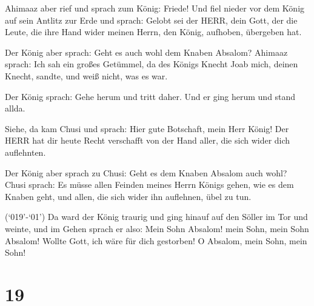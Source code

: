  Ahimaaz aber rief und sprach zum König: Friede! Und fiel
nieder vor dem König auf sein Antlitz zur Erde und sprach: Gelobt sei
der HERR, dein Gott, der die Leute, die ihre Hand wider meinen Herrn,
den König, aufhoben, übergeben hat.

 Der König aber sprach: Geht es auch wohl dem Knaben
Absalom? Ahimaaz sprach: Ich sah ein großes Getümmel, da des Königs
Knecht Joab mich, deinen Knecht, sandte, und weiß nicht, was es war.

 Der König sprach: Gehe herum und tritt daher. Und er ging
herum und stand allda.

 Siehe, da kam Chusi und sprach: Hier gute Botschaft, mein
Herr König! Der HERR hat dir heute Recht verschafft von der Hand aller,
die sich wider dich auflehnten.

 Der König aber sprach zu Chusi: Geht es dem Knaben Absalom
auch wohl? Chusi sprach: Es müsse allen Feinden meines Herrn Königs
gehen, wie es dem Knaben geht, und allen, die sich wider ihn auflehnen,
übel zu tun.

 (`019'-`01') Da ward der König traurig und ging hinauf auf
den Söller im Tor und weinte, und im Gehen sprach er also: Mein Sohn
Absalom! mein Sohn, mein Sohn Absalom! Wollte Gott, ich wäre für dich
gestorben! O Absalom, mein Sohn, mein Sohn!

\hypertarget{section-18}{%
\section{19}\label{section-18}}

